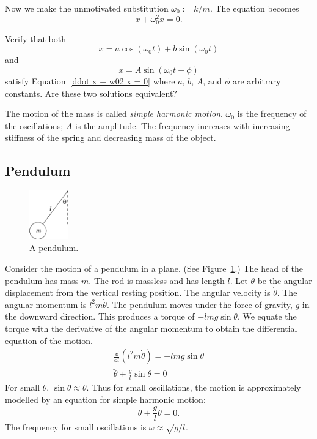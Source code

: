Now we make the unmotivated substitution $\omega_0 := k / m$.  The equation becomes
\begin{equation}
  \label{ddot x + w02 x = 0}
\ddot{x} + \omega_0^2 x = 0.
\end{equation}

\begin{Exercise}
  \label{exercise mass on spring solutions}
  Verify that both
  \[
  x = a \cos( \omega_0 t ) + b \sin( \omega_0 t )
  \]
  and
  \[
  x = A \sin( \omega_0 t + \phi )
  \]
  satisfy Equation~\ref{ddot x + w02 x = 0} where $a$, $b$, $A$, and $\phi$ are 
  arbitrary constants.  Are these two solutions equivalent?
  
\end{Exercise}

The motion of the mass is called \textit{simple harmonic motion}.
$\omega_0$ is the frequency of the oscillations; $A$ is the amplitude.  The 
frequency increases with increasing stiffness of the spring and decreasing
mass of the object.





\subsection{Pendulum}

\begin{figure}[tb!]
  \begin{center}
    \includegraphics[width=0.15\textwidth]{ode/introduction/pendulum}
  \end{center}
  \caption{A pendulum.}
  \label{figure pendulum}
\end{figure}

Consider the motion of a pendulum in a plane.  
(See Figure~\ref{figure pendulum}.)  The head of the pendulum has mass $m$.
The rod is massless and has length $l$.  Let $\theta$ be the angular displacement
from the vertical resting position.  The angular velocity is $\dot{\theta}$.
The angular momentum is $l^2 m \dot{\theta}$.  The pendulum moves under the 
force of gravity, $g$ in the downward direction.  This produces a 
torque of $- l m g \sin \theta$.  We equate the torque with the derivative 
of the angular momentum to obtain the differential equation of the 
motion.
\begin{gather*}
  \frac{ \dd }{ \dd t } ( l^2 m \dot{\theta} ) = - l m g \sin \theta
  \\
  \ddot{\theta} + \frac{g}{l} \sin \theta = 0
\end{gather*}
For small $\theta$, $\sin \theta \approx \theta$.  Thus for small oscillations, the motion 
is approximately modelled by an equation for simple harmonic motion:
\[
\ddot{\theta} + \frac{g}{l} \theta = 0.
\]
The frequency for small oscillations is $\omega \approx \sqrt{ g / l }$.


